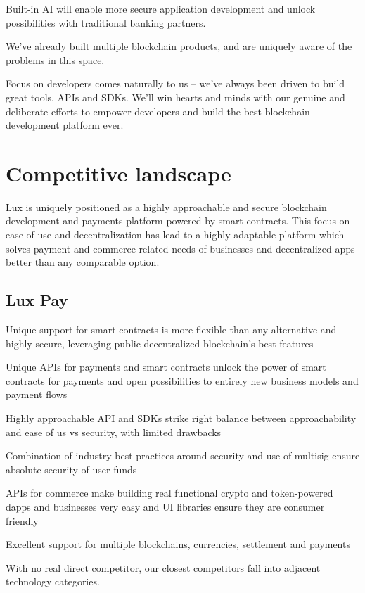 \documentclass[11pt]{article}
\begin{document}
Built-in AI will enable more secure application development and unlock possibilities with traditional banking partners.


We've already built multiple blockchain products, and are uniquely aware of the problems in this space.


Focus on developers comes naturally to us -- we've always been driven to build great tools, APIs and SDKs. We'll win hearts and minds with our genuine and deliberate efforts to empower developers and build the best blockchain development platform ever.


\section{Competitive landscape}

Lux is uniquely positioned as a highly approachable and secure blockchain development and payments platform powered by smart contracts. This focus on ease of use and decentralization has lead to a highly adaptable platform which solves payment and commerce related needs of businesses and decentralized apps better than any comparable option.


\subsection{Lux Pay}

Unique support for smart contracts is more flexible than any alternative and highly secure, leveraging public decentralized blockchain's best features


Unique APIs for payments and smart contracts unlock the power of smart contracts for payments and open possibilities to entirely new business models and payment flows


Highly approachable API and SDKs strike right balance between approachability and ease of us vs security, with limited drawbacks


Combination of industry best practices around security and use of multisig ensure absolute security of user funds


APIs for commerce make building real functional crypto and token-powered dapps and businesses very easy and UI libraries ensure they are consumer friendly


Excellent support for multiple blockchains, currencies, settlement and payments


With no real direct competitor, our closest competitors fall into adjacent technology categories.
\end{document}
